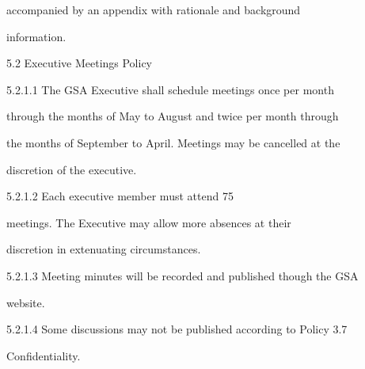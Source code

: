                 accompanied   by   an   appendix   with   rationale   and   background  

                information.   

                                                                    

                                                    5.2        Executive Meetings Policy  

  

5.2.1.1   The   GSA   Executive   shall   schedule   meetings   once   per   month  

               through the months of May to August and twice per month through  

               the months of September to April. Meetings may be cancelled at the  

               discretion of the executive.   

  

5.2.1.2   Each            executive           member           must        attend   75%

               meetings.   The   Executive   may   allow   more   absences   at   their  

               discretion in extenuating circumstances.   

  

5.2.1.3   Meeting  minutes  will  be  recorded  and  published  though  the  GSA  

               website.   

  

5.2.1.4   Some  discussions  may  not  be  published  according  to  Policy  3.7  

               Confidentiality.   

  

  

  

  

  

  

  

  

  

  

  

  

  

  

  

  

  

